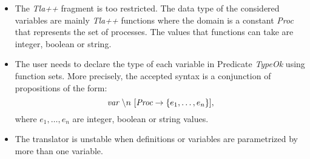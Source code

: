 \documentclass{article}
\begin{document}
\begin{itemize}

\item The \emph{Tla++} fragment is too restricted. The data type of the considered variables are mainly \emph{Tla++} functions where the domain is a constant \emph{Proc} that represents the set of processes. The values that functions can take are integer, boolean or string.  
\item  The user needs to declare the type of each variable in Predicate \emph{TypeOk} using function sets. More precisely, 
 the accepted syntax is a conjunction of propositions of the form:
$$ \emph{var} \textrm{ } \backslash n \textrm{ }  [ \emph{Proc}   \rightarrow   \{ e_1, \dots, e_n \} ], $$
 where $e_1, \dots, e_n$ are integer, boolean or string values. 
 \item The translator is unstable when definitions or variables are parametrized by more than one variable.
\end{itemize}
\end{document}

